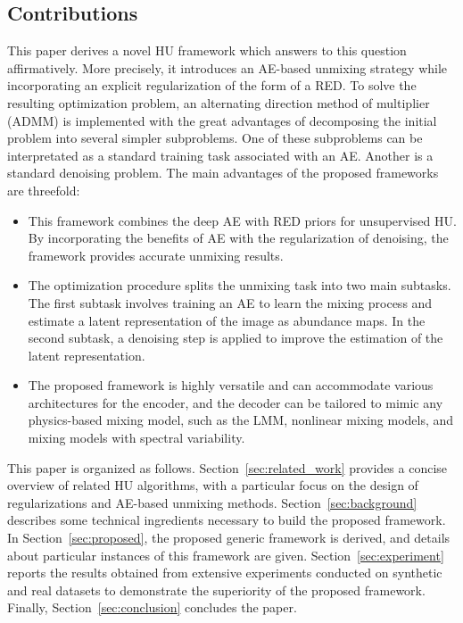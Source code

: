 \documentclass[journal,a4paper]{IEEEtran}
\begin{document}
\subsection{Contributions}
This paper derives a novel HU framework which answers to this question affirmatively. More precisely, it introduces an AE-based unmixing strategy while incorporating an explicit regularization of the form of a RED. To solve the resulting optimization problem, an alternating direction method of multiplier (ADMM) is implemented with the great advantages of decomposing the initial problem into several simpler subproblems. One of these subproblems can be interpretated as a standard training task associated with an AE. Another is a standard denoising problem. The main advantages of the proposed frameworks are threefold:
\begin{itemize}
  \item This framework combines the deep AE with RED priors for unsupervised HU. By incorporating the benefits of AE with the regularization of denoising, the framework provides accurate unmixing results.
  \item The optimization procedure splits the unmixing task into two main subtasks. The first subtask involves training an AE to learn the mixing process and estimate a latent representation of the image as abundance maps. In the second subtask, a denoising step is applied to improve the estimation of the latent representation.
  \item The proposed framework is highly versatile and can accommodate various architectures for the encoder, and the decoder can be tailored to mimic any physics-based mixing model, such as the LMM, nonlinear mixing models, and mixing models with spectral variability.
\end{itemize}

This paper is organized as follows. Section~\ref{sec:related_work} provides a concise overview of related HU algorithms, with a particular focus on the design of regularizations and AE-based unmixing methods. Section~\ref{sec:background} describes some technical ingredients necessary to build the proposed framework. In Section~\ref{sec:proposed}, the proposed generic framework is derived, and details about particular instances of this framework are given. Section~\ref{sec:experiment} reports the results obtained from extensive experiments conducted on synthetic and real datasets to demonstrate the superiority of the proposed framework. Finally, Section~\ref{sec:conclusion} concludes the paper.
\end{document}

